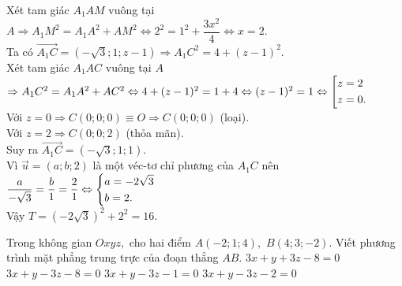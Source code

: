\begin{ex}
{{}
{
}
\noindent Xét tam giác $A_1AM$ vuông tại $A\Rightarrow A_1M^2=A_1A^2+AM^2\Leftrightarrow 2^2=1^2+\dfrac{3x^2}{4}\Leftrightarrow x=2.$\\
Ta có $\vec{A_1C}=(-\sqrt{3};1;z-1)\Rightarrow A_1C^2=4+(z-1)^2.$\\
 Xét tam giác $A_1AC$ vuông tại $A$\\
$\Rightarrow A_1C^2=A_1A^2+AC^2\Leftrightarrow 4+(z-1)^2=1+4\Leftrightarrow (z-1)^2=1\Leftrightarrow \left[\begin{aligned}&z=2\\&z=0.\end{aligned}\right.$\\
Với $z=0\Rightarrow C(0;0;0)\equiv O\Rightarrow C(0;0;0)$ (loại).\\
Với $z=2\Rightarrow C(0;0;2)$ (thỏa mãn).\\
Suy ra $\vec{A_1C}=(-\sqrt{3};1;1).$\\
Vì $\vec{u}=(a;b;2)$ là một véc-tơ chỉ phương của $A_1C$ nên $\dfrac{a}{-\sqrt{3}}=\dfrac{b}{1}=\dfrac{2}{1}\Leftrightarrow \left\{\begin{aligned}&a=-2\sqrt{3}\\&b=2.\end{aligned}\right.$\\
Vậy $T=\left(-2\sqrt{3}\right)^2+2^2=16.$
}
\end{ex}

\begin{ex}%
Trong không gian $Oxyz,$ cho hai điểm $A(-2;1;4),$ $B(4;3;-2).$ Viết phương trình mặt phẳng trung trực của đoạn thẳng $AB.$
\choice
{$3x+y+3z-8=0$}
{$3x+y-3z-8=0$}
{$3x+y-3z-1=0$}
{\True $3x+y-3z-2=0$}
\end{ex}

